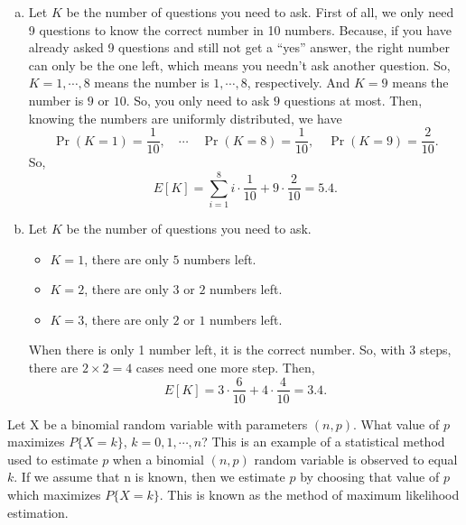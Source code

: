 \documentclass[14pt]{elegantbook}
\begin{document}
    \begin{solution}
        \begin{enumerate}[(a)]
            \item Let $K$ be the number of questions you need to ask. First of all, we only need 9 questions to know the correct number in 10 numbers. Because, if you have already asked 9 questions and still not get a ``yes'' answer, the right number can only be the one left, which means you needn't ask another question. So, $K=1,\cdots,8$ means the number is $1, \cdots, 8$, respectively. And $K=9$ means the number is $9$ or $10$. So, you only need to ask $9$ questions at most. 
            Then, knowing the numbers are uniformly distributed, we have 
            \[
                \Pr(K=1)=\frac{1}{10}, \quad \cdots \quad \Pr(K=8)=\frac{1}{10}, \quad \Pr(K=9)=\frac{2}{10}. 
            \]
            So, 
            \[
                E[K]=\sum_{i=1}^8i\cdot\frac{1}{10}+9\cdot\frac{2}{10}=5.4. 
            \]
            \item Let $K$ be the number of questions you need to ask. 
            \begin{itemize}
                \item $K=1$, there are only $5$ numbers left. 
                \item $K=2$, there are only $3$ or $2$ numbers left. 
                \item $K=3$, there are only $2$ or $1$ numbers left. 
            \end{itemize}
            When there is only 1 number left, it is the correct number. So, with 3 steps, there are $2\times 2=4$ cases need one more step. Then, 
            \[E[K]=3\cdot\frac{6}{10}+4\cdot\frac{4}{10}=3.4. \]
        \end{enumerate}
    \end{solution}

    \begin{exercise*}[3]
        Let X be a binomial random variable with parameters $(n, p)$. What value of $p$ maximizes $P\{X = k\}$, $k = 0, 1, \cdots, n$? This is an example of a statistical method used to estimate $p$ when a binomial $(n, p)$ random variable is observed to equal $k$. If we assume that n is known, then we estimate $p$ by choosing that value of $p$ which maximizes $P\{X = k\}$. This is known as the method of maximum likelihood estimation. 
    \end{exercise*}
\end{document}
